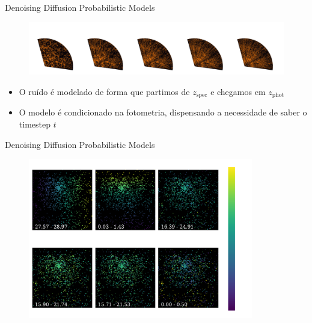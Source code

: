 \begin{frame}[c]{Denoising Diffusion Probabilistic Models}
    \begin{figure}
        \centering
        \includegraphics[width=\linewidth]{script/images/lss_illustration.pdf}
    \end{figure}
    \begin{splusbox}{}
        \begin{itemize}
            \item O ruído é modelado de forma que partimos de $z_\text{spec}$ e chegamos em $z_\text{phot}$
            \item O modelo é condicionado na fotometria, dispensando a necessidade de saber o timestep $t$
        \end{itemize}
    \end{splusbox}
\end{frame}

\begin{frame}[c]{Denoising Diffusion Probabilistic Models}
    \begin{figure}
        \centering
        \includegraphics[height=7cm]{script/images/ddpm_diffusion_features.pdf}
    \end{figure}
\end{frame}

